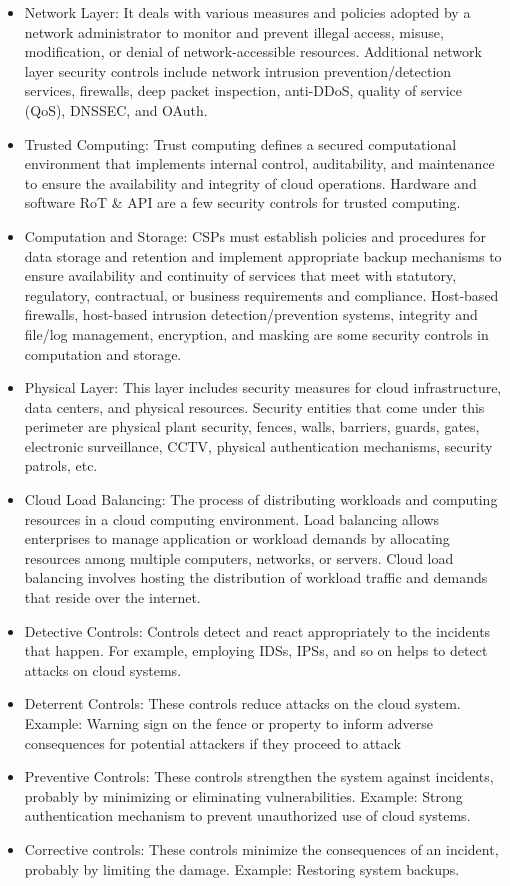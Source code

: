 \begin{itemize}
\begin{itemize}
        \item Network Layer: It deals with various measures and policies adopted by a network administrator to monitor and prevent illegal access, misuse, modification, or denial of network-accessible resources. Additional network layer security controls include network intrusion prevention/detection services, firewalls, deep packet inspection, anti-DDoS, quality of service (QoS), DNSSEC, and OAuth.
        \item Trusted Computing: Trust computing defines a secured computational environment that implements internal control, auditability, and maintenance to ensure the availability and integrity of cloud operations. Hardware and software RoT \& API are a few security controls for trusted computing.
        \item Computation and Storage: CSPs must establish policies and procedures for data storage and retention and implement appropriate backup mechanisms to ensure availability and continuity of services that meet with statutory, regulatory, contractual, or business requirements and compliance. Host-based firewalls, host-based intrusion detection/prevention systems, integrity and file/log management, encryption, and masking are some security controls in computation and storage.
        \item Physical Layer: This layer includes security measures for cloud infrastructure, data centers, and physical resources. Security entities that come under this perimeter are physical plant security, fences, walls, barriers, guards, gates, electronic surveillance, CCTV, physical authentication mechanisms, security patrols, etc.
        \item Cloud Load Balancing: The process of distributing workloads and computing resources in a cloud computing environment. Load balancing allows enterprises to manage application or workload demands by allocating resources among multiple computers, networks, or servers. Cloud load balancing involves hosting the distribution of workload traffic and demands that reside over the internet.
        \item Detective Controls: Controls detect and react appropriately to the incidents that happen. For example, employing IDSs, IPSs, and so on helps to detect attacks on cloud systems.
        \item Deterrent Controls: These controls reduce attacks on the cloud system. Example: Warning sign on the fence or property to inform adverse consequences for potential attackers if they proceed to attack
        \item Preventive Controls: These controls strengthen the system against incidents, probably by minimizing or eliminating vulnerabilities. Example: Strong authentication mechanism to prevent unauthorized use of cloud systems.
        \item Corrective controls: These controls minimize the consequences of an incident, probably by limiting the damage. Example: Restoring system backups.
    \end{itemize}
\end{itemize}

